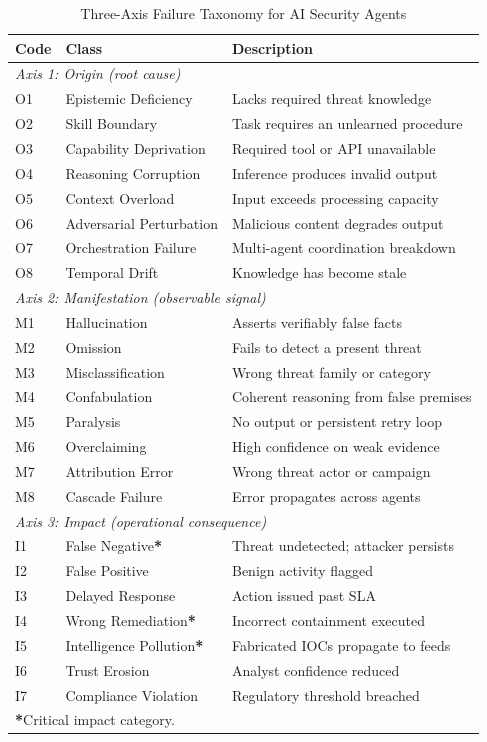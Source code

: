 \begin{table}[t]
\caption{Three-Axis Failure Taxonomy for AI Security Agents}
\label{tab:taxonomy_mag}
\centering
\footnotesize
\setlength{\tabcolsep}{3pt}
\begin{tabular}{p{0.85cm} p{2.5cm} p{4.0cm}}
\toprule
\textbf{Code} & \textbf{Class} & \textbf{Description} \\
\midrule
\multicolumn{3}{l}{\textit{Axis 1: Origin (root cause)}} \\
O1 & Epistemic Deficiency & Lacks required threat knowledge \\
O2 & Skill Boundary & Task requires an unlearned procedure \\
O3 & Capability Deprivation & Required tool or API unavailable \\
O4 & Reasoning Corruption & Inference produces invalid output \\
O5 & Context Overload & Input exceeds processing capacity \\
O6 & Adversarial Perturbation & Malicious content degrades output \\
O7 & Orchestration Failure & Multi-agent coordination breakdown \\
O8 & Temporal Drift & Knowledge has become stale \\
\midrule
\multicolumn{3}{l}{\textit{Axis 2: Manifestation (observable signal)}} \\
M1 & Hallucination & Asserts verifiably false facts \\
M2 & Omission & Fails to detect a present threat \\
M3 & Misclassification & Wrong threat family or category \\
M4 & Confabulation & Coherent reasoning from false premises \\
M5 & Paralysis & No output or persistent retry loop \\
M6 & Overclaiming & High confidence on weak evidence \\
M7 & Attribution Error & Wrong threat actor or campaign \\
M8 & Cascade Failure & Error propagates across agents \\
\midrule
\multicolumn{3}{l}{\textit{Axis 3: Impact (operational consequence)}} \\
I1 & False Negative\hfill\textbf{*} & Threat undetected; attacker persists \\
I2 & False Positive & Benign activity flagged \\
I3 & Delayed Response & Action issued past SLA \\
I4 & Wrong Remediation\hfill\textbf{*} & Incorrect containment executed \\
I5 & Intelligence Pollution\hfill\textbf{*} & Fabricated IOCs propagate to feeds \\
I6 & Trust Erosion & Analyst confidence reduced \\
I7 & Compliance Violation & Regulatory threshold breached \\
\bottomrule
\multicolumn{3}{l}{\footnotesize \textbf{*}\;Critical impact category.} \\
\end{tabular}
\end{table}

